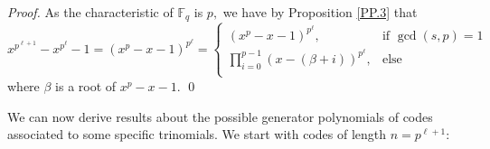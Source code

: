 \documentclass[12pt]{elsarticle}
\def\dprod #1#2{\displaystyle{\prod_{#1}^{#2}}}
\newcommand{\Fq}{\mathbb{F}_{q}}
\theoremstyle{break}
{\theorembodyfont{\upshape}
    \newtheorem{theorem}{Theorem}[section] %
    \newtheorem{lemma}[theorem]{Lemma} %
    \newtheorem{proposition}[theorem]{Proposition}
    \newtheorem{corollary}[theorem]{Corollary}
    \newtheorem{definition}[theorem]{Definition}
    \newtheorem{example}[theorem]{Example}
    \newtheorem{remark}[theorem]{Remark}
    \newtheorem{conjecture}[theorem]{Conjecture}
    \newtheorem*{proof}{{Proof}}
	\newtheorem*{notation}{Notation}
	\newtheorem*{main}{Cain Theorem}
	\newtheorem*{problem}{Problem}
}
\begin{document}
\begin{proof}
As the characteristic of $\Fq$ is $p,$ we have by Proposition \ref{PP.3} that
$$ x^{p^{\ell+1}}-x^{p^{\ell}}-1= \left(x^{p}-x-1 \right)^{p^{\ell}}=
\begin{cases}
 \left(x^{p}-x-1 \right)^{p^{\ell}} , & \text{if $\gcd(s,p)=1$ }\\
\dprod{i=0}{p-1} (x-(\beta+i))^{p^{\ell}}, & \text{else }\\
  \end{cases}
$$
 where $\beta $ is a root of $ x^p - x - 1.$
\qed 
\end{proof}


We can now derive results about the possible generator polynomials of codes associated to some specific trinomials. We start with codes of length $n=p^{\ell+1}$:
\end{document}
